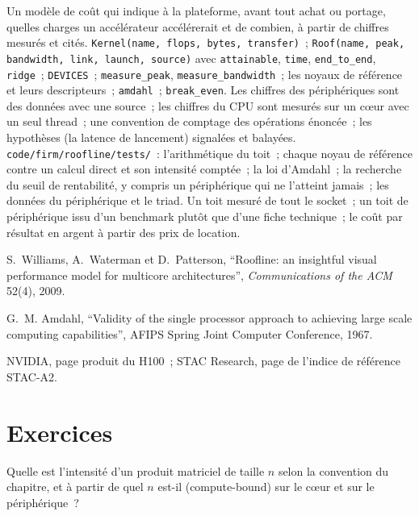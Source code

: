 \begin{build}
 Un modèle de coût qui indique à la plateforme, avant tout achat ou portage, quelles charges un accélérateur accélérerait et de
combien, à partir de chiffres mesurés et cités.
 \texttt{Kernel(name, flops, bytes, transfer)}~; \texttt{Roof(name, peak, bandwidth, link, launch, source)} avec
\texttt{attainable}, \texttt{time}, \texttt{end\_to\_end}, \texttt{ridge}~; \texttt{DEVICES}~; \texttt{measure\_peak},
\texttt{measure\_bandwidth}~; les noyaux de référence et leurs descripteurs~; \texttt{amdahl}~; \texttt{break\_even}.
 Les chiffres des périphériques sont des données avec une source~; les chiffres du CPU sont mesurés sur un cœur avec un seul thread~; une convention de comptage
des opérations énoncée~; les hypothèses (la latence de lancement) signalées et balayées.
 \texttt{code/firm/roofline/tests/}~: l'arithmétique du toit~; chaque noyau de référence contre un calcul direct et son
intensité comptée~; la loi d'Amdahl~; la recherche du seuil de rentabilité, y compris un périphérique qui ne l'atteint jamais~; les données du périphérique et le triad.
 Un toit mesuré de tout le socket~; un toit de périphérique issu d'un benchmark plutôt que d'une fiche technique~; le coût par résultat en argent
à partir des prix de location.
\end{build}

\begin{omsources}
\item S.~Williams, A.~Waterman et D.~Patterson, ``Roofline: an insightful visual performance model for multicore architectures'',
\emph{Communications of the ACM} 52(4), 2009.
\item G.~M. Amdahl, ``Validity of the single processor approach to achieving large scale computing capabilities'', AFIPS Spring Joint
Computer Conference, 1967.
\item NVIDIA, page produit du H100~; STAC Research, page de l'indice de référence STAC-A2.
\end{omsources}

\section{Exercices}

\begin{exercise}[$\star$]\label{exo:pl:accelerators-for-quantitative-work:1}
Quelle est l'intensité d'un produit matriciel de taille $n$ selon la convention du chapitre, et à partir de quel $n$ est-il  (compute-bound) sur le cœur et
sur le périphérique~?
\end{exercise}

